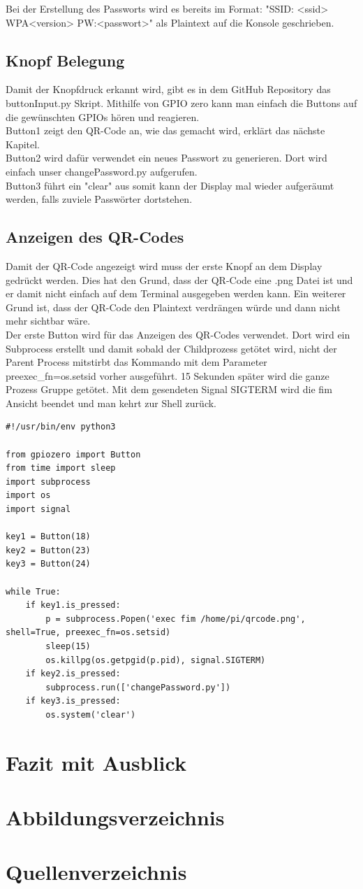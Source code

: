 \documentclass[a4paper,11pt,singlespacing]{article}
\begin{document}
    		Bei der Erstellung des Passworts wird es bereits im Format: "SSID: <ssid> WPA<version> PW:<passwort>" als Plaintext auf die Konsole geschrieben.
    		
    		\subsection{Knopf Belegung}
    		    Damit der Knopfdruck erkannt wird, gibt es in dem GitHub Repository \cite{Quote_github_repo} das buttonInput.py Skript. Mithilfe von GPIO zero kann man einfach die Buttons auf die gewünschten GPIOs hören und reagieren. \\
	    		Button1 zeigt den QR-Code an, wie das gemacht wird, erklärt das nächste Kapitel. \\
	    		Button2 wird dafür verwendet ein neues Passwort zu generieren. Dort wird einfach unser changePassword.py aufgerufen. \\
	    		Button3 führt ein "clear" aus somit kann der Display mal wieder aufgeräumt werden, falls zuviele Passwörter dortstehen.
    		
    		\subsection{Anzeigen des QR-Codes}
    			Damit der QR-Code angezeigt wird muss der erste Knopf an dem Display gedrückt werden. Dies hat den Grund, dass der QR-Code eine .png Datei ist und er damit nicht einfach auf dem Terminal ausgegeben werden kann. Ein weiterer Grund ist, dass der QR-Code den Plaintext verdrängen würde und dann nicht mehr sichtbar wäre. \\
    			Der erste Button wird für das Anzeigen des QR-Codes verwendet. Dort wird ein Subprocess erstellt und damit sobald der Childprozess getötet wird, nicht der Parent Process mitstirbt das Kommando mit dem Parameter preexec\_fn=os.setsid vorher ausgeführt. 15 Sekunden später wird die ganze Prozess Gruppe getötet. Mit dem gesendeten Signal SIGTERM wird die fim Ansicht beendet und man kehrt zur Shell zurück. \\ 
    			\begin{lstlisting}
#!/usr/bin/env python3

from gpiozero import Button
from time import sleep
import subprocess
import os
import signal

key1 = Button(18)
key2 = Button(23)
key3 = Button(24)

while True:
	if key1.is_pressed:
		p = subprocess.Popen('exec fim /home/pi/qrcode.png', shell=True, preexec_fn=os.setsid)
		sleep(15)
		os.killpg(os.getpgid(p.pid), signal.SIGTERM)
	if key2.is_pressed:
		subprocess.run(['changePassword.py'])
	if key3.is_pressed:
		os.system('clear')
    			\end{lstlisting}

    	\section{Fazit mit Ausblick}
    	\pagebreak
    	\section{Abbildungsverzeichnis}
    	\listoffigures
    	\section{Quellenverzeichnis}
        
        
    	
\end{document}
